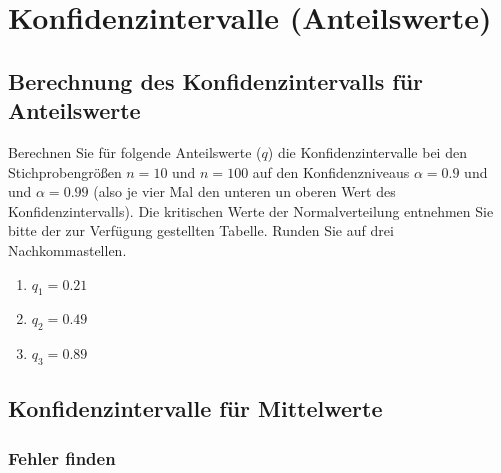 \section{Konfidenzintervalle (Anteilswerte)}

\subsection{Berechnung des Konfidenzintervalls für Anteilswerte}

Berechnen Sie für folgende Anteilswerte ($q$) die Konfidenzintervalle bei den Stichprobengrößen $n=10$ und $n=100$ auf den Konfidenzniveaus $\alpha=0.9$ und und $\alpha=0.99$ (also je vier Mal den unteren un oberen Wert des Konfidenzintervalls).
Die kritischen Werte der Normalverteilung entnehmen Sie bitte der zur Verfügung gestellten Tabelle.
Runden Sie auf drei Nachkommastellen.

\begin{enumerate}
  \item $q_1=0.21$ 
  \item $q_2=0.49$
  \item $q_3=0.89$
\end{enumerate}



\subsection{Konfidenzintervalle für Mittelwerte}

\subsubsection{Fehler finden}

